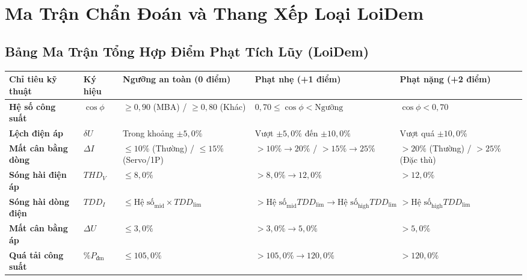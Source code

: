 \documentclass[12pt,a4paper]{article}
\begin{document}
\clearpage
\section{Ma Trận Chẩn Đoán và Thang Xếp Loại LoiDem}

\subsection{Bảng Ma Trận Tổng Hợp Điểm Phạt Tích Lũy (LoiDem)}

\begin{center}
\small
\setlength{\tabcolsep}{4pt}
\begin{tabular}{>{\raggedright\arraybackslash}p{3.0cm}
                  >{\centering\arraybackslash}p{1.4cm}
                  >{\raggedright\arraybackslash}p{3.5cm}
                  >{\raggedright\arraybackslash}p{3.8cm}
                  >{\raggedright\arraybackslash}p{3.5cm}}
\toprule
\rowcolor{primary}
\color{white}\textbf{Chỉ tiêu kỹ thuật} & \color{white}\textbf{Ký hiệu} &
\color{white}\textbf{Ngưỡng an toàn (0 điểm)} & \color{white}\textbf{Phạt nhẹ (+1 điểm)} &
\color{white}\textbf{Phạt nặng (+2 điểm)} \\
\midrule
\textbf{Hệ số công suất} & $\cos\phi$ &
$\ge0{,}90$ (MBA) / $\ge0{,}80$ (Khác) &
$0{,}70\le\cos\phi<\text{Ngưỡng}$ & $\cos\phi<0{,}70$ \\
\rowcolor{lightgray}
\textbf{Lệch điện áp} & $\delta U$ & Trong khoảng $\pm5{,}0\%$ &
Vượt $\pm5{,}0\%$ đến $\pm10{,}0\%$ & Vượt quá $\pm10{,}0\%$ \\
\textbf{Mất cân bằng dòng} & $\Delta I$ &
$\le10\%$ (Thường) / $\le15\%$ (Servo/1P) &
$>10\%\to20\%$ / $>15\%\to25\%$ &
$>20\%$ (Thường) / $>25\%$ (Đặc thù) \\
\rowcolor{lightgray}
\textbf{Sóng hài điện áp} & $THD_V$ & $\le8{,}0\%$ &
$>8{,}0\%\to12{,}0\%$ & $>12{,}0\%$ \\
\textbf{Sóng hài dòng điện} & $TDD_I$ &
$\le \text{Hệ số}_{\mathrm{mid}} \times TDD_{\mathrm{lim}}$ &
$>\text{Hệ số}_{\mathrm{mid}}TDD_{\mathrm{lim}} \to \text{Hệ số}_{\mathrm{high}}TDD_{\mathrm{lim}}$ &
$>\text{Hệ số}_{\mathrm{high}}TDD_{\mathrm{lim}}$ \\
\rowcolor{lightgray}
\textbf{Mất cân bằng áp} & $\Delta U$ & $\le3{,}0\%$ &
$>3{,}0\%\to5{,}0\%$ & $>5{,}0\%$ \\
\textbf{Quá tải công suất} & $\%P_{\text{đm}}$ & $\le105{,}0\%$ &
$>105{,}0\%\to120{,}0\%$ & $>120{,}0\%$ \\
\bottomrule
\end{tabular}
\end{center}
\end{document}
